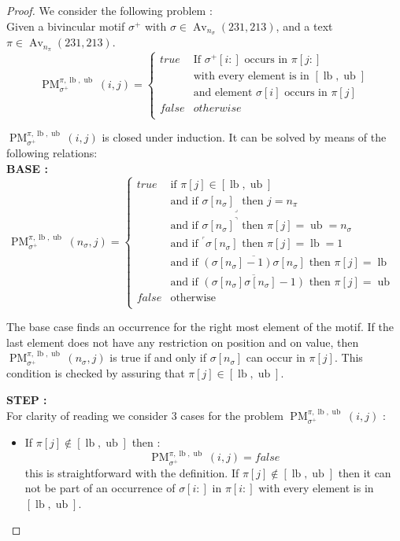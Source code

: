 \documentclass[a4paper]{llncs}
\DeclareMathOperator{\Avd}{Av}
\newcommand\Av[2]{\Avd_{{#1}}({#2})}
\newcommand{\ptext}{\pi}
\newcommand{\pmotif}{\sigma}
\newcommand{\pbmotif}{\pmotif^+}
\DeclareMathOperator{\PMa}{PM}
\newcommand{\PM}[6]{\PMa_{{#1}}^{{#2},{#3},{#4}}({#5},{#6})}
\DeclareMathOperator{\lb}{lb}
\DeclareMathOperator{\ub}{ub}
\begin{document}
\begin{proof}
We consider the following problem :\\
Given a bivincular motif $\pbmotif$ with $\pmotif \in \Av{n_\pmotif}{231,213} $, and a text $\ptext \in \Av{n_\ptext}{231,213}$.
$$
\PM{\pbmotif}{\ptext}{\lb}{\ub}{i}{j}=
\begin{cases}
	true 	& \text{If $\pbmotif[i:]$ occurs in $\ptext[j:]$}\\
			& \text{with every element is in $[\lb,\ub]$}\\
			& \text{and element $\pmotif[i]$ occurs in $\ptext[j]$ }\\
	false 	& otherwise\\
\end{cases}
$$

$\PM{\pbmotif}{\ptext}{\lb}{\ub}{i}{j}$ is closed under induction.
It can be solved by means of the following relations:\\
\textbf{BASE :} \\
$$
\PM{\pbmotif}{\ptext}{\lb}{\ub}{n_\pmotif}{j}=
\begin{cases}
	true 	& \text{if $\ptext[j] \in [\lb,\ub ]$}\\
			& \text{and if ${\pmotif[n_\pmotif]}_\lrcorner$ then $j=n_\ptext$}\\
			& \text{and if ${\pmotif[n_\pmotif]}^\urcorner$ then $\ptext[j]=\ub=n_\pmotif$}\\
			& \text{and if  $^\ulcorner{\pmotif[n_\pmotif]}$ then $\ptext[j]=\lb=1$ } \\
			& \text{and if  $\overline{(\pmotif[n_\pmotif]-1)\pmotif[n_\pmotif] }$ then $\ptext[j]=\lb$ }  \\
			& \text{and if  $\overline{(\pmotif[n_\pmotif]\pmotif[n_\pmotif]-1)}$ then $\ptext[j]=\ub$}  \\
		
	false	& \text{otherwise} \\
\end{cases}
$$

The base case finds an occurrence for the right most element of the motif. If the last element does not have any restriction on position and on value, then $\PM{\pbmotif}{\ptext}{\lb}{\ub}{n_\pmotif}{j}$ is true if and only if $\pmotif[n_\pmotif]$ can occur in $\ptext[j]$. This condition is checked by assuring that $\ptext[j] \in [\lb,\ub]$. 

\textbf{STEP :} \\
For clarity of reading we consider 3 cases for the problem $\PM{\pbmotif}{\ptext}{\lb}{\ub}{i}{j}$ :
\begin{itemize}
	\item If $\ptext[j] \notin [\lb,\ub]$ then :
	$$
	\PM{\pbmotif}{\ptext}{\lb}{\ub}{i}{j} = false
	$$
	this is straightforward with the definition. If $\ptext[j] \notin [\lb,\ub]$ then it can not be part of an occurrence of  $\pmotif[i:]$ in $\ptext[i:]$ with every element is in $[\lb,\ub]$.
	

\end{itemize}
\end{proof}
\end{document}
